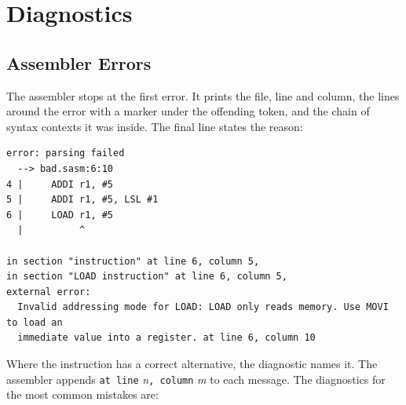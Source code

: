 \chapter{Diagnostics}
\label{ch:diagnostics}

\section{Assembler Errors}

The assembler stops at the first error. It prints the file, line and column, the lines around the error with a marker
under the offending token, and the chain of syntax contexts it was inside. The final line states the reason:

\begin{lstlisting}[language={}]
error: parsing failed
  --> bad.sasm:6:10
4 |     ADDI r1, #5
5 |     ADDI r1, #5, LSL #1
6 |     LOAD r1, #5
  |          ^

in section "instruction" at line 6, column 5,
in section "LOAD instruction" at line 6, column 5,
external error:
  Invalid addressing mode for LOAD: LOAD only reads memory. Use MOVI to load an
  immediate value into a register. at line 6, column 10
\end{lstlisting}

Where the instruction has a correct alternative, the diagnostic names it. The assembler appends \texttt{at line}
\emph{n}\texttt{, column} \emph{m} to each message. The diagnostics for the most common mistakes are:

